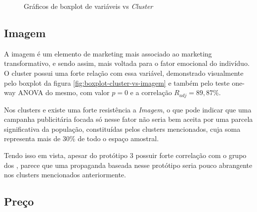\begin{figure}[h]
\begin{centering}
\par\end{centering}

\caption{Gráficos de boxplot de variáveis vs \emph{Cluster}}
\end{figure}

\subsection{Imagem}

A imagem é um elemento de marketing mais associado ao marketing transformativo,
e sendo assim, mais voltada para o fator emocional do indivíduo. O
cluster \emph{\nomeCb{}} possui uma forte relação com essa variável,
demonstrado visualmente pelo boxplot da figura \ref{fig:boxplot-cluster-vs-imagem}
e também pelo teste one-way ANOVA do mesmo, com valor $p=0$ e a correlação
$R_{adj}=89,87\%$.

Nos clusters \emph{\nomeCc{}} e \emph{\nomeCd{}} existe uma forte
resistência a \emph{Imagem}, o que pode indicar que uma campanha publicitária
focada só nesse fator não seria bem aceita por uma parcela significativa
da população, constituídas pelos clusters mencionados, cuja soma representa
mais de 30\% de todo o espaço amostral.

Tendo isso em vista, apesar do protótipo 3 possuir forte correlação
com o grupo dos \emph{\nomeCb{}}, parece que uma propaganda baseada
nesse protótipo seria pouco abrangente nos clusters mencionados anteriormente. 

\subsection{Preço}

